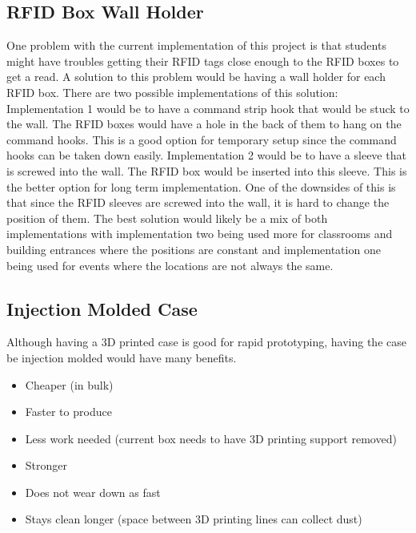 \documentclass[12pt]{article}
\begin{document}
\begin{spacing}{1.2}
\subsection{RFID Box Wall Holder}

One problem with the current implementation of this project is that students might have troubles getting their RFID tags close enough to the RFID boxes to get a read. A solution to this problem would be having a wall holder for each RFID box.
\newline\newline
There are two possible implementations of this solution:
\newline\newline
Implementation 1 would be to have a command strip hook that would be stuck to the wall. The RFID boxes would have a hole in the back of them to hang on the command hooks. This is a good option for temporary setup since the command hooks can be taken down easily.
\newline\newline
Implementation 2 would be to have a sleeve that is screwed into the wall. The RFID box would be inserted into this sleeve. This is the better option for long term implementation. One of the downsides of this is that since the RFID sleeves are screwed into the wall, it is hard to change the position of them.
\newline\newline
The best solution would likely be a mix of both implementations with implementation two being used more for classrooms and building entrances where the positions are constant and implementation one being used for events where the locations are not always the same. 

\subsection{Injection Molded Case}

Although having a 3D printed case is good for rapid prototyping, having the case be injection molded would have many benefits.
\begin{itemize}
	\item Cheaper (in bulk)
	\item Faster to produce
	\item Less work needed (current box needs to have 3D printing support removed)
	\item Stronger
	\item Does not wear down as fast
	\item Stays clean longer (space between 3D printing lines can collect dust)
\end{itemize}


\end{spacing}
\end{document}
